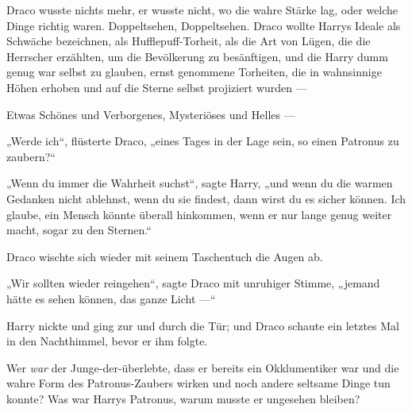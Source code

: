 Draco wusste nichts mehr, er wusste nicht, wo die wahre Stärke lag, oder welche Dinge richtig waren. Doppeltsehen, Doppeltsehen. Draco wollte Harrys Ideale als Schwäche bezeichnen, als Hufflepuff-Torheit, als die Art von Lügen, die die Herrscher erzählten, um die Bevölkerung zu besänftigen, und die Harry dumm genug war selbst zu glauben, ernst genommene Torheiten, die in wahnsinnige Höhen erhoben und auf die Sterne selbst projiziert wurden —

Etwas Schönes und Verborgenes, Mysteriöses und Helles —

„Werde ich“, flüsterte Draco, „eines Tages in der Lage sein, so einen Patronus zu zaubern?“

„Wenn du immer die Wahrheit suchst“, sagte Harry, „und wenn du die warmen Gedanken nicht ablehnst, wenn du sie findest, dann wirst du es sicher können. Ich glaube, ein Mensch könnte überall hinkommen, wenn er nur lange genug weiter macht, sogar zu den Sternen.“

Draco wischte sich wieder mit seinem Taschentuch die Augen ab.

„Wir sollten wieder reingehen“, sagte Draco mit unruhiger Stimme, „jemand hätte es sehen können, das ganze Licht —“

Harry nickte und ging zur und durch die Tür; und Draco schaute ein letztes Mal in den Nachthimmel, bevor er ihm folgte.

Wer \emph{war} der Junge-der-überlebte, dass er bereits ein Okklumentiker war und die wahre Form des Patronus-Zaubers wirken und noch andere seltsame Dinge tun konnte? Was war Harrys Patronus, warum musste er ungesehen bleiben?

